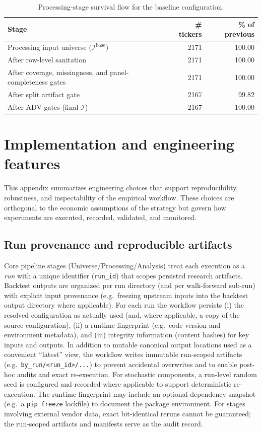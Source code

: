 \documentclass[11pt,a4paper]{article}
\begin{document}
\begin{table}[!htbp]
  \centering
  \caption{Processing-stage survival flow for the baseline configuration.}
  \label{tab:processing_filters}
  \begin{tabularx}{\linewidth}{Xrr}
    \toprule
    Stage & \# tickers & \% of previous \\
    \midrule
    Processing input universe (\(\mathcal I^{\mathrm{base}}\)) & 2171 & 100.00 \\
    After row-level sanitation & 2171 & 100.00 \\
    After coverage, missingness, and panel-completeness gates & 2171 & 100.00 \\
    After split artifact gate & 2167 & 99.82 \\
    After ADV gates (final \(\mathcal I\)) & 2167 & 100.00 \\
    \bottomrule
  \end{tabularx}
\end{table}

\section{Implementation and engineering features}
\label{app:engineering}

This appendix summarizes engineering choices that support reproducibility,
robustness, and inspectability of the empirical workflow. These choices are
orthogonal to the economic assumptions of the strategy but govern how
experiments are executed, recorded, validated, and monitored.

\subsection*{Run provenance and reproducible artifacts}
Core pipeline stages (Universe/Processing/Analysis) treat each execution as a
\emph{run} with a unique identifier (\texttt{run\_id}) that scopes persisted
research artifacts. Backtest outputs are organized per run directory (and per
walk-forward sub-run) with explicit input provenance (e.g.\ freezing upstream
inputs into the backtest output directory where applicable). For each run the
workflow persists (i) the resolved configuration as actually used (and, where
applicable, a copy of the source configuration), (ii) a runtime fingerprint
(e.g.\ code version and environment metadata), and (iii) integrity information
(content hashes) for key inputs and outputs. In addition to mutable canonical
output locations used as a convenient ``latest'' view, the workflow writes
immutable run-scoped artifacts (e.g.\ \texttt{by\_run/<run\_id>/...}) to prevent
accidental overwrites and to enable post-hoc audits and exact re-execution. For
stochastic components, a run-level random seed is configured and recorded where
applicable to support deterministic re-execution. The runtime fingerprint may
include an optional dependency snapshot (e.g.\ a \texttt{pip freeze} lockfile)
to document the package environment. For stages involving external vendor data,
exact bit-identical reruns cannot be guaranteed; the run-scoped artifacts and
manifests serve as the audit record.
\end{document}
